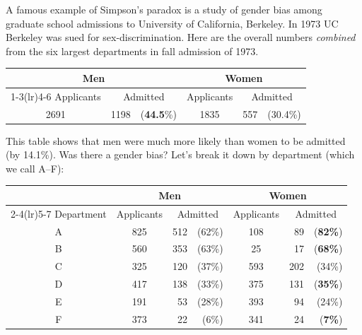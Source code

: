 \begin{example}
A famous example of Simpson's paradox is a study of gender bias among graduate
school admissions to University of California, Berkeley. In 1973 UC Berkeley was
sued for sex-discrimination. Here are the overall numbers \textit{combined} from
the six largest departments in fall admission of 1973.

\begin{table}[H]
  \begin{tabular*}{\textwidth}{@{\extracolsep{\fill}}crrcrr}
    \toprule
    \multicolumn{3}{c}{Men} & \multicolumn{3}{c}{Women} \\
    \cmidrule(lr){1-3}\cmidrule(lr){4-6}
    Applicants & \multicolumn{2}{c}{Admitted} & Applicants
                                              & \multicolumn{2}{c}{Admitted} \\
    \midrule
    2691 & 1198 & ({\bf 44.5}\%) & 1835 & 557 & (30.4\%) \\
    \bottomrule
  \end{tabular*}
\end{table}

This table shows that men were much more likely than women to be admitted (by
14.1\%). Was there a gender bias? Let's break it down by department (which we
call A--F):

\begin{table}[H]
\begin{tabular*}{\textwidth}{@{\extracolsep{\fill}} ccrrcrr}
  \toprule
  & \multicolumn{3}{c}{Men}  & \multicolumn{3}{c}{Women} \\
  \cmidrule(lr){2-4}\cmidrule(lr){5-7}
  Department & Applicants  & \multicolumn{2}{c}{Admitted} & Applicants
                           & \multicolumn{2}{c}{Admitted} \\
  \midrule
A & 825 & 512& (62\%) & 108 & 89 &(\textbf{82\%})  \\ 
B & 560 & 353& (63\%) & 25  & 17 &(\textbf{68\%})  \\
C & 325 & 120& (37\%) & 593 & 202& (34\%) \\
D & 417 & 138& (33\%) & 375 & 131& (\textbf{35\%}) \\
E & 191 & 53 & (28\%) & 393 & 94 &(24\%)  \\
F & 373 & 22 & (6\%) & 341 & 24 &(\textbf{7\%})  \\
  \bottomrule
\end{tabular*}
\end{table}


\end{example}
